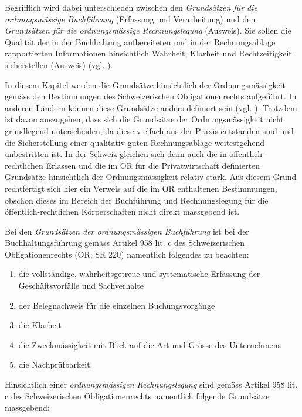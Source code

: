 \documentclass[10pt]{article}
\begin{document}
Begrifflich wird dabei unterschieden zwischen den \textit{Grundsätzen für die ordnungsmässige Buchführung} (Erfassung und Verarbeitung) und den \textit{Grundsätzen für die ordnungsmässige Rechnungslegung} (Ausweis). Sie sollen die Qualität der in der Buchhaltung aufbereiteten und in der Rechnungsablage rapportierten Informationen hinsichtlich Wahrheit, Klarheit und Rechtzeitigkeit sicherstellen (Ausweis) (vgl. \cite[S. 19]{WP1}).

In diesem Kapitel werden die Grundsätze hinsichtlich der Ordnungsmässigkeit gemäss den Bestimmungen des Schweizerischen Obligationenrechts aufgeführt. In anderen Ländern können diese Grundsätze anders definiert sein (vgl. \cite[S. 19]{WP1}). Trotzdem ist davon auszugehen, dass sich die Grundsätze der Ordnungsmässigkeit nicht grundlegend unterscheiden, da diese vielfach aus der Praxis entstanden sind und die Sicherstellung einer qualitativ guten Rechnungsablage weitestgehend unbestritten ist. In der Schweiz gleichen sich denn auch die in öffentlich-rechtlichen Erlassen und die im OR für die Privatwirtschaft definierten Grundsätze hinsichtlich der Ordnungsmässigkeit relativ stark. Aus diesem Grund rechtfertigt sich hier ein Verweis auf die im OR enthaltenen Bestimmungen, obschon dieses im Bereich der Buchführung und Rechnungslegung für die öffentlich-rechtlichen Körperschaften nicht direkt massgebend ist.

Bei den \textit{Grundsätzen der ordnungsmässigen Buchführung} ist bei der Buchhaltungsführung gemäss Artikel 958 lit. c des Schweizerischen Obligationenrechts (OR; SR 220) namentlich folgendes zu beachten:

\begin{enumerate}
    \item die vollständige, wahrheitsgetreue und systematische Erfassung der Geschäftsvorfälle und Sachverhalte

    \item der Belegnachweis für die einzelnen Buchungsvorgänge

    \item die Klarheit

    \item die Zweckmässigkeit mit Blick auf die Art und Grösse des Unternehmens

    \item die Nachprüfbarkeit.

\end{enumerate}

Hinsichtlich einer \textit{ordnungsmässigen Rechnungslegung} sind gemäss Artikel 958 lit. c des Schweizerischen Obligationenrechts namentlich folgende Grundsätze massgebend:
\end{document}
